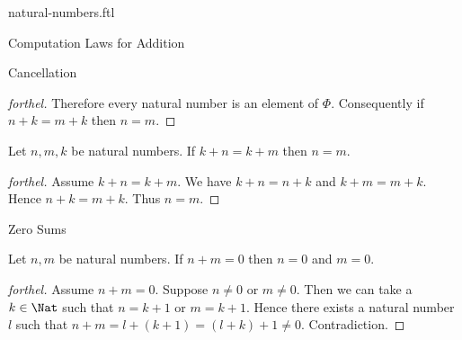 \documentclass{naproche-library}
\begin{document}
\begin{smodule}[title=Natural Numbers]{natural-numbers.ftl}
\begin{sfragment}{Computation Laws for Addition}
\begin{sfragment}{Cancellation}
\begin{proof}[forthel]
      Therefore every natural number is an element of $\Phi$.
      Consequently if $n + k = m + k$ then $n = m$.
    \end{proof}

    \begin{corollary}[forthel,id=ARITHMETIC_03_8445946379632640]
      Let $n, m, k$ be natural numbers.
      If $k + n = k + m$ then $n = m$.
    \end{corollary}
    \begin{proof}[forthel]
      Assume $k + n = k + m$.
      We have $k + n = n + k$ and $k + m = m + k$.
      Hence $n + k = m + k$.
      Thus $n = m$.
    \end{proof}
  \end{sfragment}

  \begin{sfragment}{Zero Sums}
    \begin{proposition}[forthel,id=ARITHMETIC_03_3520602170195968]
      Let $n, m$ be natural numbers.
      If $n + m = 0$ then $n = 0$ and $m = 0$.
    \end{proposition}
    \begin{proof}[forthel]
      Assume $n + m = 0$.
      Suppose $n \neq 0$ or $m \neq 0$.
      Then we can take a $k \in \Nat$ such that $n = k + 1$ or $m = k + 1$.
      Hence there exists a natural number $l$ such that
      $n + m
        = l + (k + 1)
        = (l + k) + 1
        \neq 0$.
      Contradiction.
    \end{proof}
  \end{sfragment}
\end{sfragment}
\end{smodule}
\end{document}
